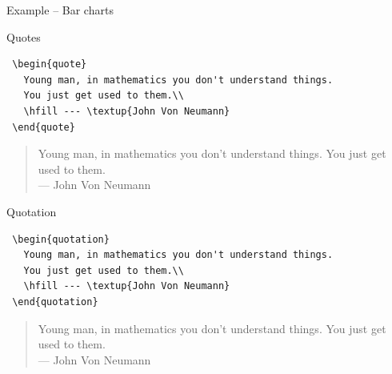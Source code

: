 \documentclass[10pt]{beamer}
\begin{document}
\begin{frame}{Example -- Bar charts}
  \begin{figure}
  \end{figure}
\end{frame}

\begin{frame}[fragile]{Quotes }
\begin{verbatim}
 \begin{quote}
   Young man, in mathematics you don't understand things. 
   You just get used to them.\\
   \hfill --- \textup{John Von Neumann}
 \end{quote}
\end{verbatim}
 
 \vskip1cm

\begin{quote}
Young man, in mathematics you don't understand things. You just get used to them.\\
\hfill --- \textup{John Von Neumann}
\end{quote}
\end{frame}

\begin{frame}[fragile]{Quotation }
\begin{verbatim}
 \begin{quotation}
   Young man, in mathematics you don't understand things. 
   You just get used to them.\\
   \hfill --- \textup{John Von Neumann}
 \end{quotation}
\end{verbatim}
 
 \vskip1cm

\begin{quotation}
Young man, in mathematics you don't understand things. You just get used to them.\\
\hfill --- \textup{John Von Neumann}
\end{quotation}
\end{frame}
\end{document}
